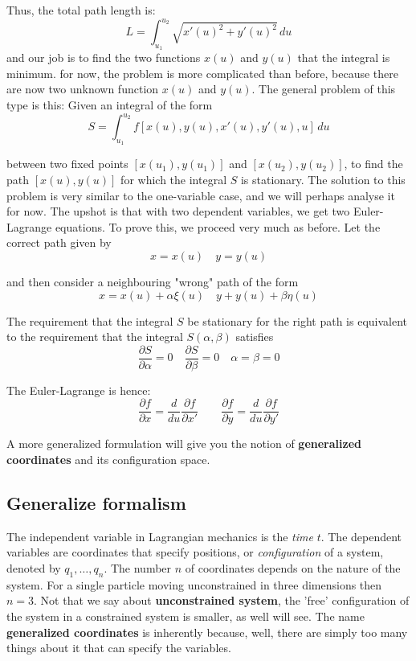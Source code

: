 Thus, the total path length is: $$L=\int _{u_{1}}^{u_{2}} \sqrt{ x'(u)^{2}+y'(u)^{2} } \, du $$
and our job is to find the two functions $x(u)$ and $y(u)$ that the integral is minimum. for now, the problem is more complicated than before, because there are now two unknown function $x(u)$ and $y(u)$. The general problem of this type is this: Given an integral of the form $$S=\int _{u_{1}}^{u_{2}} f[x(u),y(u),x'(u),y'(u),u] \, du $$

between two fixed points $[x(u_{1}),y(u_{1})]$ and $[x(u_{2}),y(u_{2})]$, to find the path $[x(u),y(u)]$ for which the integral $S$ is stationary. The solution to this problem is very similar to the one-variable case, and we will perhaps analyse it for now. The upshot is that with two dependent variables, we get two Euler-Lagrange equations. To prove this, we proceed very much as before. Let the correct path given by $$x=x(u)\quad y=y(u)$$

and then consider a neighbouring "wrong" path of the form 
$$x= x(u)+\alpha \xi(u)\quad y + y(u)+\beta \eta(u)$$

The requirement that the integral $S$ be stationary for the right path is equivalent to the requirement that the integral $S(\alpha,\beta)$ satisfies $$\frac{\partial S}{\partial \alpha}=0\quad \frac{\partial S}{\partial \beta}=0\quad \alpha=\beta=0$$

The Euler-Lagrange is hence: $$\frac{\partial f}{\partial x} = \frac{d}{du} \frac{\partial f}{\partial x'}\quad \quad \frac{\partial f}{\partial y}=\frac{d}{du} \frac{\partial f}{\partial y'}$$

A more generalized formulation will give you the notion of \textbf{generalized coordinates} and its configuration space. 

\subsection{Generalize formalism}

The independent variable in Lagrangian mechanics is the \textit{time} $t$. The dependent variables are coordinates that specify positions, or \textit{configuration} of a system, denoted by $q_{1},\dots,q_{n}$. The number $n$ of coordinates depends on the nature of the system. For a single particle moving unconstrained in three dimensions then $n=3$. Not that we say about \textbf{unconstrained system}, the 'free' configuration of the system in a constrained system is smaller, as well will see. The name \textbf{generalized coordinates} is inherently because, well, there are simply too many things about it that can specify the variables. 

